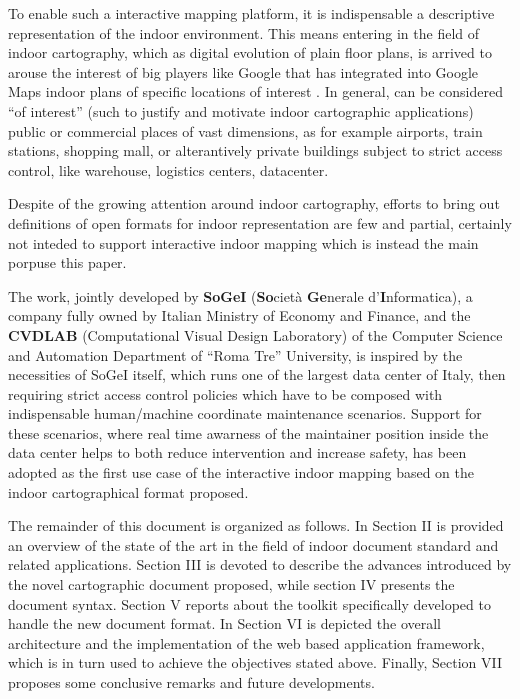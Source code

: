 To enable such a interactive mapping platform, it is indispensable a descriptive representation of the indoor environment. This means entering in the field of indoor cartography, which as digital evolution of plain floor plans, is arrived to arouse the interest of big players like Google that has integrated into Google Maps indoor plans of specific locations of interest \cite{indoormaps}. In general, can be considered ``of interest'' (such to justify and motivate indoor cartographic applications) public or commercial places of vast dimensions, as for example airports, train stations, shopping mall, or alterantively private buildings subject to strict access control, like warehouse, logistics centers, datacenter. 

Despite of the growing attention around indoor cartography, efforts to bring out definitions of open formats for indoor representation are few and partial, certainly not inteded to support interactive indoor mapping which is instead the main porpuse this paper. 

The work, jointly developed by {\bf SoGeI} ({\bf So}ciet\`a {\bf Ge}nerale d'{\bf I}nformatica), a company fully owned by Italian  Ministry of Economy and Finance, and the {\bf CVDLAB} (Computational Visual Design Laboratory) of the Computer Science and Automation Department of ``Roma Tre'' University, is inspired by the necessities of SoGeI itself, which runs one of the largest data center of Italy, then requiring strict access control policies which have to be composed with indispensable human/machine coordinate maintenance scenarios. Support for these scenarios, where real time awarness of the maintainer position inside the data center helps to both reduce intervention and increase safety, has been adopted as the first use case of the interactive indoor mapping based on the indoor cartographical format proposed.


The remainder of this document is organized as follows. In Section II is
provided an overview of the state of the art in the field of indoor document
standard and related applications. Section III is devoted to describe the
advances introduced by the novel cartographic document proposed, while section
IV presents the document syntax. Section V reports about the toolkit
specifically developed to handle the new document format. In Section VI is
depicted the overall architecture and the implementation of the web based
application framework, which is in turn used to achieve the objectives stated above.
Finally, Section VII proposes some conclusive remarks and future developments.

